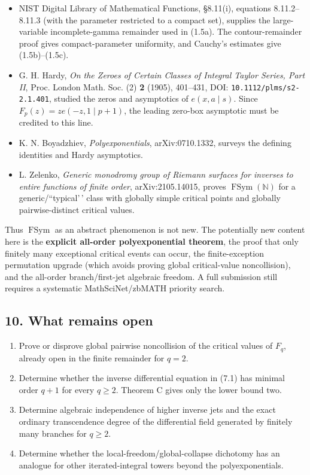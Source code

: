 \documentclass[11pt]{article}
\theoremstyle{keio}
\theoremstyle{definition}
\theoremstyle{remark}
\providecommand{\tightlist}{\setlength{\itemsep}{0pt}\setlength{\parskip}{0pt}}
\begin{document}
\begin{itemize}
\tightlist
\item
  NIST Digital Library of Mathematical Functions, \S8.11(i), equations
  8.11.2--8.11.3 (with the parameter restricted to a compact set), supplies
  the large-variable incomplete-gamma remainder used in (1.5a). The
  contour-remainder proof gives compact-parameter uniformity, and Cauchy's
  estimates give (1.5b)--(1.5c).
\item
  G. H. Hardy, \emph{On the Zeroes of Certain Classes of Integral Taylor
  Series, Part II}, Proc. London Math. Soc. (2) \textbf{2} (1905), 401--431,
  DOI: \texttt{10.1112/plms/s2-2.1.401}, studied the zeros and asymptotics of
  \(e(x,a\mid s)\). Since \(F_p(z)=z e(-z,1\mid p+1)\), the leading
  zero-box asymptotic must be credited to this line.
\item
  K. N. Boyadzhiev, \emph{Polyexponentials}, arXiv:0710.1332, surveys the
  defining identities and Hardy asymptotics.
\item
  L. Zelenko, \emph{Generic monodromy group of Riemann surfaces for inverses to
  entire functions of finite order}, arXiv:2105.14015, proves
  \(\operatorname{FSym}(\mathbb N)\) for a generic/``typical'\,' class with
  globally simple critical points and globally pairwise-distinct critical
  values.
\end{itemize}

Thus \(\operatorname{FSym}\) as an abstract phenomenon is not new. The
potentially new content here is the \textbf{explicit all-order polyexponential
theorem}, the proof that only finitely many exceptional critical events can
occur, the finite-exception permutation upgrade (which avoids proving global
critical-value noncollision), and the all-order branch/first-jet algebraic
freedom. A full submission still requires a systematic MathSciNet/zbMATH
priority search.

\subsection{10. What remains open}

\begin{enumerate}
\def\labelenumi{\arabic{enumi}.}
\tightlist
\item
  Prove or disprove global pairwise noncollision of the critical values of
  \(F_q\), already open in the finite remainder for \(q=2\).
\item
  Determine whether the inverse differential equation in (7.1) has minimal
  order \(q+1\) for every \(q\geq2\). Theorem C gives only the lower bound
  two.
\item
  Determine algebraic independence of higher inverse jets and the exact
  ordinary transcendence degree of the differential field generated by
  finitely many branches for \(q\geq2\).
\item
  Determine whether the local-freedom/global-collapse dichotomy has an
  analogue for other iterated-integral towers beyond the polyexponentials.
\end{enumerate}
\end{document}

